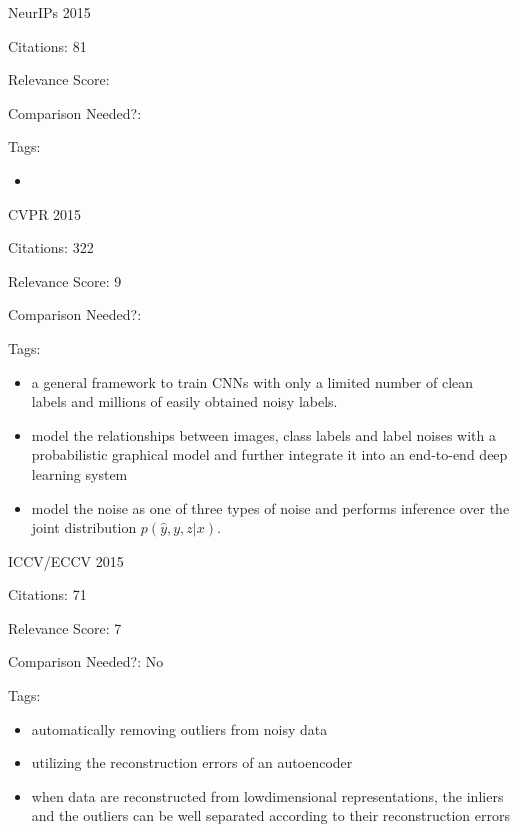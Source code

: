 \documentclass[11pt]{article}
\begin{document}
\noindent NeurIPs 2015

\noindent Citations: 81

\noindent Relevance Score:

\noindent Comparison Needed?: 

\noindent Tags:

\begin{itemize}
\item 
\end{itemize}


\vspace{2cm}

\noindent CVPR 2015

\noindent Citations: 322

\noindent Relevance Score: 9

\noindent Comparison Needed?: 

\noindent Tags:

\begin{itemize}
\item a general framework to train CNNs with only a limited number of clean labels and millions of easily obtained noisy labels.
\item  model the relationships between images, class labels and label noises with a probabilistic graphical model and further integrate it into an end-to-end deep learning system
\item model the noise as one of three types of noise and performs inference over the joint distribution $p(\hat{y},y,z | x)$.
\end{itemize}

\vspace{2cm}

\noindent ICCV/ECCV 2015

\noindent Citations: 71

\noindent Relevance Score: 7

\noindent Comparison Needed?: No

\noindent Tags:

\begin{itemize}
\item automatically removing outliers from noisy data
\item utilizing the reconstruction errors of an autoencoder
\item when data are reconstructed from lowdimensional representations, the inliers and the outliers can be well separated according to their reconstruction errors
\end{itemize}
\end{document}
